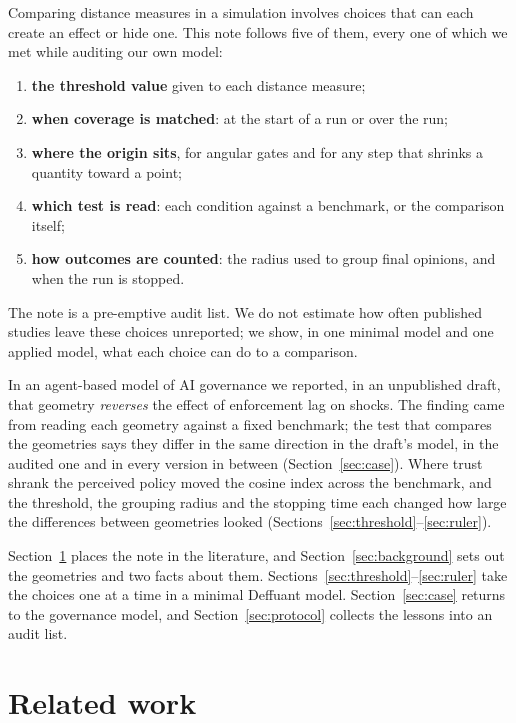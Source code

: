 \documentclass[11pt]{article}
\begin{document}
Comparing distance measures in a simulation involves choices that can each create an effect or hide one.
This note follows five of them, every one of which we met while auditing our own model:
\begin{enumerate}
\item \textbf{the threshold value} given to each distance measure;
\item \textbf{when coverage is matched}: at the start of a run or over the run;
\item \textbf{where the origin sits}, for angular gates and for any step that shrinks a quantity toward a point;
\item \textbf{which test is read}: each condition against a benchmark, or the comparison itself;
\item \textbf{how outcomes are counted}: the radius used to group final opinions, and when the run is stopped.
\end{enumerate}
The note is a pre-emptive audit list.
We do not estimate how often published studies leave these choices unreported; we show, in one minimal model and one applied model, what each choice can do to a comparison.

In an agent-based model of AI governance we reported, in an unpublished draft, that geometry \emph{reverses} the effect of enforcement lag on shocks.
The finding came from reading each geometry against a fixed benchmark; the test that compares the geometries says they differ in the same direction in the draft's model, in the audited one and in every version in between (Section~\ref{sec:case}).
Where trust shrank the perceived policy moved the cosine index across the benchmark, and the threshold, the grouping radius and the stopping time each changed how large the differences between geometries looked (Sections~\ref{sec:threshold}--\ref{sec:ruler}).

Section~\ref{sec:related} places the note in the literature, and Section~\ref{sec:background} sets out the geometries and two facts about them.
Sections~\ref{sec:threshold}--\ref{sec:ruler} take the choices one at a time in a minimal Deffuant model.
Section~\ref{sec:case} returns to the governance model, and Section~\ref{sec:protocol} collects the lessons into an audit list.

\section{Related work}
\label{sec:related}
\end{document}
